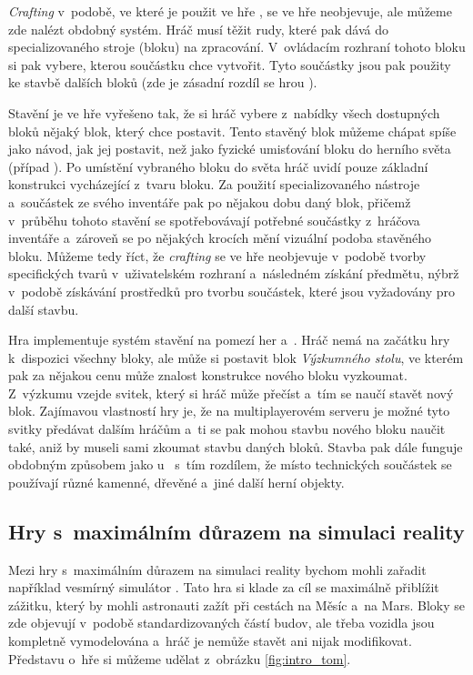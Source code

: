 \textit{Crafting} v~podobě, ve které je použit ve hře \MC{}, se ve hře \SE{} neobjevuje, ale můžeme zde nalézt obdobný systém. Hráč musí těžit rudy, které pak dává do specializovaného stroje (bloku) na zpracování. V~ovládacím rozhraní tohoto bloku si pak vybere, kterou součástku chce vytvořit. Tyto součástky jsou pak použity ke stavbě dalších bloků (zde je zásadní rozdíl se hrou \MC{}).

Stavění je ve hře \SE{} vyřešeno tak, že si hráč vybere z~nabídky všech dostupných bloků nějaký blok, který chce postavit. Tento stavěný blok můžeme chápat spíše jako návod, jak jej postavit, než jako fyzické umisťování bloku do herního světa (případ ). Po umístění vybraného bloku do světa hráč uvidí pouze základní konstrukci vycházející z~tvaru bloku. Za použití specializovaného nástroje a~součástek ze svého inventáře pak po nějakou dobu  daný blok, přičemž v~průběhu tohoto stavění se spotřebovávají potřebné součástky z~hráčova inventáře a~zároveň se po nějakých krocích mění vizuální podoba stavěného bloku. Můžeme tedy říct, že \textit{crafting} se ve hře \SE{} neobjevuje v~podobě tvorby specifických tvarů v~uživatelském rozhraní a~následném získání předmětu, nýbrž v~podobě získávání prostředků pro tvorbu součástek, které jsou vyžadovány pro další stavbu.

Hra \ME{} implementuje systém stavění na pomezí her \MC{} a~\SE{}. Hráč nemá na začátku hry k~dispozici všechny bloky, ale může si postavit blok \textit{Výzkumného stolu}, ve kterém pak za nějakou cenu může znalost konstrukce nového bloku vyzkoumat. Z~výzkumu vzejde svitek, který si hráč může přečíst a~tím se naučí stavět nový blok. Zajímavou vlastností hry je, že na multiplayerovém serveru je možné tyto svitky předávat dalším hráčům a~ti se pak mohou stavbu nového bloku naučit také, aniž by museli sami zkoumat stavbu daných bloků. Stavba pak dále funguje obdobným způsobem jako u~\SE{} s~tím rozdílem, že místo technických součástek se používají různé kamenné, dřevěné a~jiné další herní objekty. 




\subsection{Hry s~maximálním důrazem na simulaci reality}

Mezi hry s~maximálním důrazem na simulaci reality bychom mohli zařadit například vesmírný simulátor \TM{}. Tato hra si klade za cíl se maximálně přiblížit zážitku, který by mohli astronauti zažít při cestách na Měsíc a~na Mars. Bloky se zde objevují v~podobě standardizovaných částí budov, ale třeba vozidla jsou kompletně vymodelována a~hráč je nemůže stavět ani nijak modifikovat. Představu o~hře si můžeme udělat z~obrázku \ref{fig:intro_tom}.

